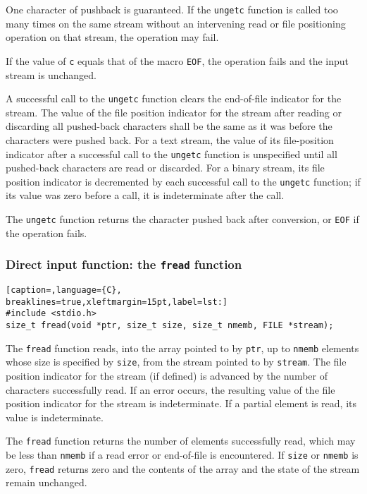 One character of pushback is guaranteed. If the \texttt{ungetc} function is
called too many times on the same stream without an intervening read or file
positioning operation on that stream, the operation may fail.

If the value of \texttt{c} equals that of the macro \texttt{EOF}, the operation
fails and the input stream is unchanged.

A successful call to the \texttt{ungetc} function clears the end-of-file
indicator for the stream. The value of the file position indicator for the
stream after reading or discarding all pushed-back characters shall be the same
as it was before the characters were pushed back. For a text stream, the value
of its file-position indicator after a successful call to the \texttt{ungetc}
function is unspecified until all pushed-back characters are read or discarded.
For a binary stream, its file position indicator is decremented by each
successful call to the \texttt{ungetc} function; if its value was zero before a
call, it is indeterminate after the call.

The \texttt{ungetc} function returns the character pushed back after
conversion, or \texttt{EOF} if the operation fails.

\subsubsection{Direct input function: the \texttt{fread} function}
\lstset{basicstyle=\scriptsize, numbers=left, captionpos=b, tabsize=4}
\begin{lstlisting}[caption=,language={C},
breaklines=true,xleftmargin=15pt,label=lst:]
#include <stdio.h>
size_t fread(void *ptr, size_t size, size_t nmemb, FILE *stream);
\end{lstlisting}

The \texttt{fread} function reads, into the array pointed to by \texttt{ptr},
up to \texttt{nmemb} elements whose size is specified by \texttt{size}, from
the stream pointed to by \texttt{stream}. The file position indicator for the
stream (if defined) is advanced by the number of characters successfully read.
If an error occurs, the resulting value of the file position indicator for the
stream is indeterminate. If a partial element is read, its value is
indeterminate.

The \texttt{fread} function returns the number of elements successfully read,
which may be less than \texttt{nmemb} if a read error or end-of-file is
encountered. If \texttt{size} or \texttt{nmemb} is zero, \texttt{fread} returns
zero and the contents of the array and the state of the stream remain
unchanged.

